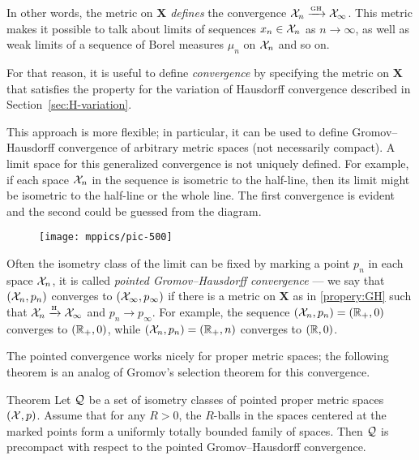 In other words, the metric on $\bm{X}$ \textit{defines} the convergence $\spc{X}_n\z\GHto \spc{X}_\infty$.
This metric makes it possible to talk about limits of sequences $x_n\in \mathcal{X}_n$ as $n\to\infty$, as well as weak limits of a sequence of Borel measures $\mu_n$ on $\mathcal{X}_n$ and so on.

For that reason, it is useful to define \emph{convergence} by specifying the metric on $\bm{X}$ that satisfies the property
for the variation of Hausdorff convergence described in Section~\ref{sec:H-variation}.

This approach is more flexible;
in particular, it can be used to define Gromov--Hausdorff convergence of arbitrary metric spaces (not necessarily compact).
A limit space for this generalized convergence is not uniquely defined.
For example, if each space $\mathcal{X}_n$ in the sequence is isometric to the half-line, then its limit might be isometric to the half-line or the whole line.
The first convergence is evident and the second could be guessed from the diagram.

\begin{figure}[ht!]
\vskip-0mm
\centering
\texttt{[image: mppics/pic-500]}
\end{figure}

Often the isometry class of the limit can be fixed by marking a point $p_n$ in each space $\mathcal{X}_n$, it is called \emph{pointed Gromov--Hausdorff convergence} --- we say that $(\mathcal{X}_n,p_n)$ converges to $(\mathcal{X}_\infty,p_\infty)$ if there is a metric on $\bm{X}$ as in \ref{propery:GH} such that $\mathcal{X}_n\xrightarrow{\mbox{\tiny\rm H}} \mathcal{X}_\infty$ and $p_n\to p_\infty$.
For example, the sequence $(\mathcal{X}_n,p_n)=(\mathbb{R}_+,0)$ converges to $(\mathbb{R}_+,0)$, while $(\mathcal{X}_n,p_n)=(\mathbb{R}_+,n)$ converges to $(\mathbb{R},0)$.

The pointed convergence works nicely for proper metric spaces;
the following theorem is an analog of Gromov's selection theorem for this convergence.

\begin{thm}{Theorem}\label{thm:pointed-gromov-compactness}%
Let $\mathcal{Q}$ be a set of isometry classes of pointed proper metric spaces
$(\mathcal{X},p)$.
Assume that for any $R>0$, the $R$-balls in the spaces centered at the marked points form a uniformly totally bounded family of spaces.
Then $\mathcal{Q}$ is precompact with respect to the pointed Gromov--Hausdorff convergence. 
\end{thm}
